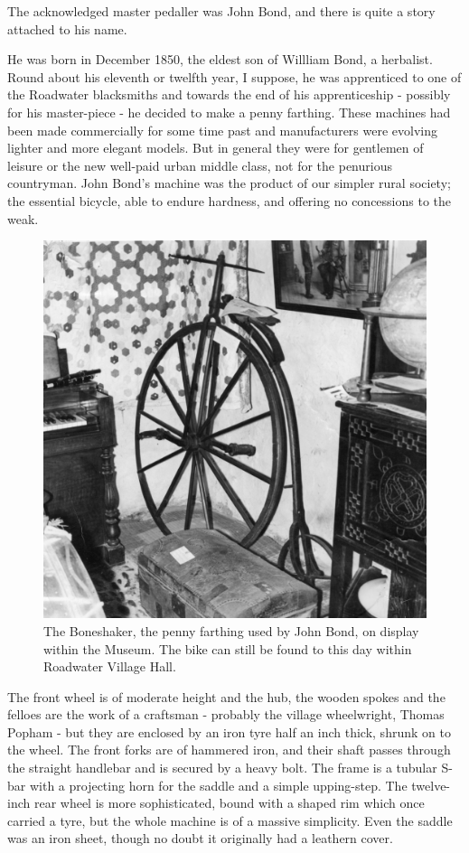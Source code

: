 The acknowledged master pedaller was John Bond, and there is quite a story attached to his name. 

He was born in December 1850, the eldest son of Willliam Bond, a herbalist. Round about his eleventh or twelfth year, I suppose, he was apprenticed to one of the Roadwater blacksmiths and towards the end of his apprenticeship - possibly for his master-piece - he decided to make a penny farthing. These machines had been made commercially for some time past and manufacturers were evolving lighter and more elegant models. But in general they were for gentlemen of leisure or the new well-paid urban middle class, not for the penurious countryman. John Bond's machine was the product of our simpler rural society; the essential bicycle, able to endure hardness, and offering no concessions to the weak.

\begin{figure}[!b]
     \includegraphics[width=1\textwidth]{figures/Boneshaker}
     \caption{The Boneshaker, the penny farthing used by John Bond, on display within the Museum. The bike can still be found to this day within Roadwater Village Hall.}
     \label{fig:SomersetLife}
\end{figure}

The front wheel is of moderate height and the hub, the wooden spokes and the felloes are the work of a craftsman - probably the village wheelwright, Thomas Popham - but they are enclosed by an iron tyre half an inch thick, shrunk on to the wheel. The front forks are of hammered iron, and their shaft passes through the straight handlebar and is secured by a heavy bolt. The frame is a tubular S-bar with a projecting horn for the saddle and a simple upping-step. The twelve-inch rear wheel is more sophisticated, bound with a shaped rim which once carried a tyre, but the whole machine is of a massive simplicity. Even the saddle was an iron sheet, though no doubt it originally had a leathern cover.

